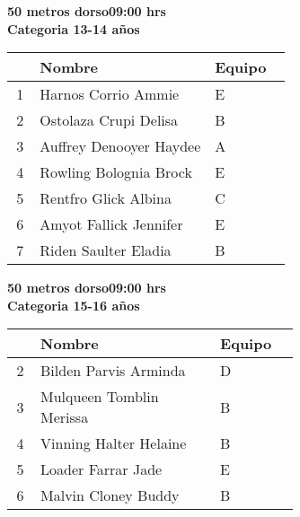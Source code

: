 \begin{minipage}{0.95\linewidth}\vspace{0.5cm} 
\begin{flushleft}
\textbf{
\hspace{-0.15cm}50 metros dorso\hspace{1.5cm}09:00 hrs \\Categoria 13-14 años}\vspace{-0.2cm} 
\end{flushleft}
\begin{tabular}{cp{0.63\linewidth}l}
\hline
& \textbf{Nombre} & \textbf{Equipo} \\ \hline
1 & Harnos Corrio Ammie & E \\ 
2 & Ostolaza Crupi Delisa & B \\ 
3 & Auffrey Denooyer Haydee & A \\ 
4 & Rowling Bolognia Brock & E \\ 
5 & Rentfro Glick Albina & C \\ 
6 & Amyot Fallick Jennifer & E \\ 
7 & Riden Saulter Eladia & B \\ 
\end{tabular}
\end{minipage}
\begin{minipage}{0.95\linewidth}\vspace{0.5cm} 
\begin{flushleft}
\textbf{
\hspace{-0.15cm}50 metros dorso\hspace{1.5cm}09:00 hrs \\Categoria 15-16 años}\vspace{-0.2cm} 
\end{flushleft}
\begin{tabular}{cp{0.63\linewidth}l}
\hline
& \textbf{Nombre} & \textbf{Equipo} \\ \hline
2 & Bilden Parvis Arminda & D \\ 
3 & Mulqueen Tomblin Merissa & B \\ 
4 & Vinning Halter Helaine & B \\ 
5 & Loader Farrar Jade & E \\ 
6 & Malvin Cloney Buddy & B \\ 
\end{tabular}
\end{minipage}
